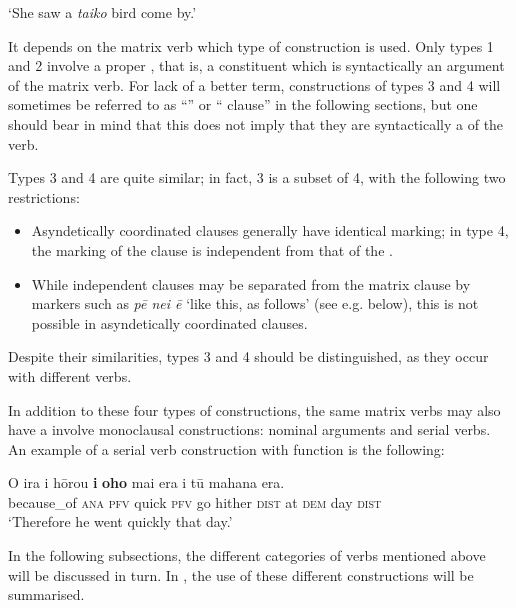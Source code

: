 \glt
‘She saw a \textit{taiko} bird come by.’ \textstyleExampleref{[Ley-9-55.078]}
\z


It depends on the matrix verb which type of construction is used. Only types 1 and 2 involve a proper , that is, a constituent which is syntactically an argument of the matrix verb. For lack of a better term, constructions of types 3 and 4 will sometimes be referred to as “” or “ clause” in the following sections, but one should bear in mind that this does not imply that they are syntactically a  of the verb.

Types 3 and 4 are quite similar; in fact, 3 is a subset of 4, with the following two restrictions:

\begin{itemize}
\item 
Asyndetically coordinated clauses generally have identical  marking; in type 4, the  marking of the  clause is independent from that of the .

\item 
While independent clauses may be separated from the matrix clause by markers such as \textit{pē nei ē} ‘like this, as follows’ (see e.g.  below), this is not possible in asyndetically coordinated clauses.

\end{itemize}

Despite their similarities, types 3 and 4 should be distinguished, as they occur with different verbs.

In addition to these four types of constructions, the same matrix verbs may also have a involve monoclausal constructions: nominal arguments and serial verbs. An example of a serial verb construction with  function is the following:

\ea\label{ex:11.32}
\gll {\ꞌ}O ira i hōrou \textbf{i} \textbf{oho} mai era {\ꞌ}i tū mahana era. \\
because\_of \textsc{ana} \textsc{pfv} quick \textsc{pfv} go hither \textsc{dist} at \textsc{dem} day \textsc{dist} \\

\glt
‘Therefore he went quickly that day.’ \textstyleExampleref{[R105.108]} 
\z

In the following subsections, the different categories of verbs mentioned above will be discussed in turn. In , the use of these different constructions will be summarised.

